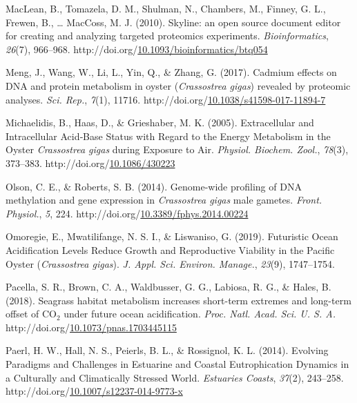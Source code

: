 \documentclass [11pt, proquest] {uwthesis}[2015/03/03]
\newlength{\cslhangindent}
\newenvironment{CSLReferences}%
{\setlength{\parindent}{0pt}%
\everypar{\setlength{\hangindent}{\cslhangindent}}\ignorespaces}%
{\par}
\begin{document}
\begin{CSLReferences}{1}{0}
\leavevmode\hypertarget{ref-MacLean2010}{}%
MacLean, B., Tomazela, D. M., Shulman, N., Chambers, M., Finney, G. L., Frewen, B., \ldots{} MacCoss, M. J. (2010). {Skyline: an open source document editor for creating and analyzing targeted proteomics experiments}. \emph{Bioinformatics}, \emph{26}(7), 966--968. http://doi.org/\href{https://doi.org/10.1093/bioinformatics/btq054}{10.1093/bioinformatics/btq054}

\leavevmode\hypertarget{ref-Meng2017}{}%
Meng, J., Wang, W., Li, L., Yin, Q., \& Zhang, G. (2017). {Cadmium effects on DNA and protein metabolism in oyster (\emph{Crassostrea gigas}) revealed by proteomic analyses}. \emph{Sci. Rep.}, \emph{7}(1), 11716. http://doi.org/\href{https://doi.org/10.1038/s41598-017-11894-7}{10.1038/s41598-017-11894-7}

\leavevmode\hypertarget{ref-Michaelidis2005}{}%
Michaelidis, B., Haas, D., \& Grieshaber, M. K. (2005). {Extracellular and Intracellular Acid‐Base Status with Regard to the Energy Metabolism in the Oyster \emph{Crassostrea gigas} during Exposure to Air}. \emph{Physiol. Biochem. Zool.}, \emph{78}(3), 373--383. http://doi.org/\href{https://doi.org/10.1086/430223}{10.1086/430223}

\leavevmode\hypertarget{ref-Olson2014}{}%
Olson, C. E., \& Roberts, S. B. (2014). {Genome-wide profiling of DNA methylation and gene expression in \emph{Crassostrea gigas} male gametes}. \emph{Front. Physiol.}, \emph{5}, 224. http://doi.org/\href{https://doi.org/10.3389/fphys.2014.00224}{10.3389/fphys.2014.00224}

\leavevmode\hypertarget{ref-Omoregie2019}{}%
Omoregie, E., Mwatilifange, N. S. I., \& Liswaniso, G. (2019). {Futuristic Ocean Acidification Levels Reduce Growth and Reproductive Viability in the Pacific Oyster (\emph{Crassostrea gigas})}. \emph{J. Appl. Sci. Environ. Manage.}, \emph{23}(9), 1747--1754.

\leavevmode\hypertarget{ref-Pacella2018}{}%
Pacella, S. R., Brown, C. A., Waldbusser, G. G., Labiosa, R. G., \& Hales, B. (2018). {Seagrass habitat metabolism increases short-term extremes and long-term offset of {CO\(_2\)} under future ocean acidification}. \emph{Proc. Natl. Acad. Sci. U. S. A.} http://doi.org/\href{https://doi.org/10.1073/pnas.1703445115}{10.1073/pnas.1703445115}

\leavevmode\hypertarget{ref-Paerl2014}{}%
Paerl, H. W., Hall, N. S., Peierls, B. L., \& Rossignol, K. L. (2014). {Evolving Paradigms and Challenges in Estuarine and Coastal Eutrophication Dynamics in a Culturally and Climatically Stressed World}. \emph{Estuaries Coasts}, \emph{37}(2), 243--258. http://doi.org/\href{https://doi.org/10.1007/s12237-014-9773-x}{10.1007/s12237-014-9773-x}


\end{CSLReferences}
\end{document}
